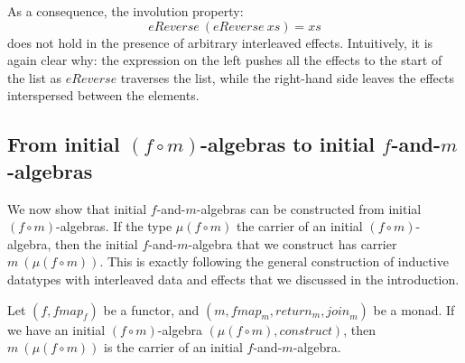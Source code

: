 As a consequence, the involution property:
\begin{displaymath}
  \mathit{eReverse}~(\mathit{eReverse}~\mathit{xs}) = \mathit{xs}
\end{displaymath}
does not hold in the presence of arbitrary interleaved
effects. Intuitively, it is again clear why: the expression on the
left pushes all the effects to the start of the list as
$\mathit{eReverse}$ traverses the list, while the right-hand side
leaves the effects interspersed between the elements.




\subsection{From initial $(f \circ m)$-algebras to initial $f$-and-$m$-algebras}

We now show that initial $f$-and-$m$-algebras can be constructed from
initial $(f \circ m)$-algebras. If the type $\mu(f \circ m)$ the
carrier of an initial $(f \circ m)$-algebra, then the initial
$f$-and-$m$-algebra that we construct has carrier $m~(\mu (f \circ
m))$. This is exactly following the general construction of inductive
datatypes with interleaved data and effects that we discussed in the
introduction.

\begin{theorem}\label{thm:make-initial-f-and-m-alg}
  Let $(f, \mathit{fmap}_f)$ be a functor, and $(m, \mathit{fmap}_m,
  \mathit{return}_m, \mathit{join}_m)$ be a monad.  If we have an
  initial $(f \circ m)$-algebra $(\mu(f \circ m),
  \mathit{construct})$, then $m~(\mu(f \circ m))$ is the carrier of an
  initial $f$-and-$m$-algebra.
\end{theorem}

